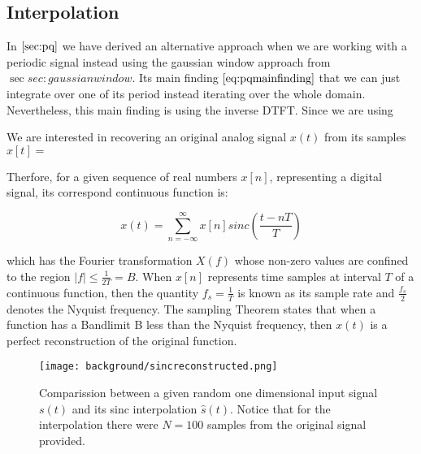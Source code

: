\subsection{Interpolation}
\label{sec:sincinterpolation}

In $\ref{sec:pq}$ we have derived an alternative approach when we are working with a periodic signal instead using the gaussian window approach from $\sec{sec:gaussianwindow}$. Its main finding $\ref{eq:pqmainfinding}$ that we can just integrate over one of its period instead iterating over the whole domain. Nevertheless, this main finding is using the inverse DTFT. Since we are using 

We are interested in recovering an original analog signal $x(t)$ from its samples $x[t] = $ 

Therfore, for a given sequence of real numbers $x[n]$, representing a digital signal, its correspond continuous function is: 

\begin{equation}
  x(t) = \sum_{n=-\infty}^{\infty} x[n] sinc\left(\frac{t-nT}{T}\right)
\end{equation}

which has the Fourier transformation $X(f)$ whose non-zero values are confined to the region $|f| \leq \frac{1}{2T} = B$.
When $x[n]$ represents time samples at interval $T$ of a continuous function, then the quantity $f_s = \frac{1}{T}$ is known as its sample rate and $\frac{f_s}{2}$ denotes the Nyquist frequency. The sampling Theorem states that when a function has a Bandlimit B less than the Nyquist frequency, then $x(t)$ is a perfect reconstruction of the original function. 

\begin{figure}[ht]
  \centering
  \texttt{[image: background/sincreconstructed.png]}
  \caption{Comparission between a given random one dimensional input signal $s(t)$ and its sinc interpolation $\hat{s}(t)$. Notice that for the interpolation there were $N=100$ samples from the original signal provided.}
  \label{fig:plotsincinterpolation}  
\end{figure}


